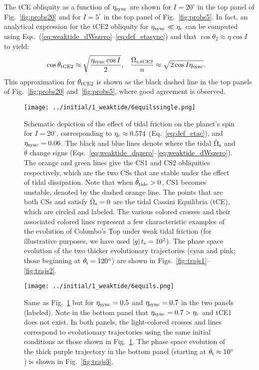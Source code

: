 \documentclass[
        fleqn,
        usenatbib,
    ]{mnras}
\newcommand*{\abs}[1]{\left|#1\right|}
\begin{document}
The tCE obliquity as a function of $\eta_{\rm sync}$ are shown for $I =
20^\circ$ in the top panel of Fig.~\ref{fig:probs20} and for $I = 5^\circ$ in
the top panel of Fig.~\ref{fig:probs5}. In fact, an analytical expression for
the tCE2 obliquity for $\eta_{\rm sync} \ll \eta_{\rm c}$ can be computed using
Eqs.~(\ref{eq:weaktide_dWszero}--\ref{eq:def_etasync}) and that $\cos \theta_2
\approx \eta \cos I$ to yield:
\begin{align}
    \cos \theta_{\rm tCE2} &\approx \sqrt{\frac{\eta_{\rm sync} \cos I}{2}},
        &
    \frac{\Omega_{\rm s, tCE2}}{n} &\approx
        \sqrt{2\cos I \eta_{\rm sync}}. \label{eq:def_tce2_approx}
\end{align}
This approximation for $\theta_{\rm tCE2}$ is shown as the black dashed line in
the top panels of Fig.~\ref{fig:probs20} and~\ref{fig:probs5}, where good
agreement is observed.
\begin{figure*}
    \centering
    \texttt{[image: ../initial/1\_weaktide/6equilssingle.png]}
    \caption{Schematic depiction of the effect of tidal friction on the planet's
    spin for $I = 20^\circ$, corresponding to $\eta_{\rm c} \approx 0.574$
    (Eq.~\ref{eq:def_etac}), and $\eta_{\rm sync} = 0.06$. The black and blue
    lines denote where the tidal $\dot{\Omega}_{\rm s}$ and $\dot{\theta}$
    change signs (Eqs.~\ref{eq:weaktide_dqzero}--\ref{eq:weaktide_dWszero}). The
    orange and green lines give the CS1 and CS2 obliquities respectively, which
    are the two CSs that are stable under the effect of tidal dissipation. Note
    that when $\dot{\theta}_{\rm tide} > 0$, CS1 becomes unstable, denoted by
    the dashed orange line. The points that are both CSs and satisfy
    $\dot{\Omega}_{\rm s} = 0$ are the tidal Cassini Equilibria (tCE), which are
    circled and labeled. The various colored crosses and their associated
    colored lines represent a few characteristic examples of the evolution of
    Colombo's Top under weak tidal friction (for illustrative purposes, we have
    used $\abs{g}t_{\rm s} = 10^2$). The phase space evolution of the two
    thicker evolutionary trajectories (cyan and pink; those beginning at
    $\theta_{\rm i} = 120^\circ$) are shown in
    Figs.~\ref{fig:trajs1}--\ref{fig:trajs2}.
    }\label{fig:6equilssingle}
\end{figure*}
\begin{figure}
    \centering
    \texttt{[image: ../initial/1\_weaktide/6equils.png]}
    \caption{Same as Fig.~\ref{fig:6equilssingle} but for $\eta_{\rm sync} =
    0.5$ and $\eta_{\rm sync} = 0.7$ in the two panels (labeled). Note in the
    bottom panel that $\eta_{\rm sync} = 0.7 > \eta_{\rm c}$ and tCE1 does not
    exist. In both panels, the light-colored crosses and lines correspond to
    evolutionary trajectories using the same initial conditions as those shown
    in Fig.~\ref{fig:6equilssingle}. The phase space evolution of the thick
    purple trajectory in the bottom panel (starting at $\theta_{\rm i} \approx
    10^\circ$) is shown in Fig.~\ref{fig:trajs3}. }\label{fig:6equils}
\end{figure}
\end{document}
